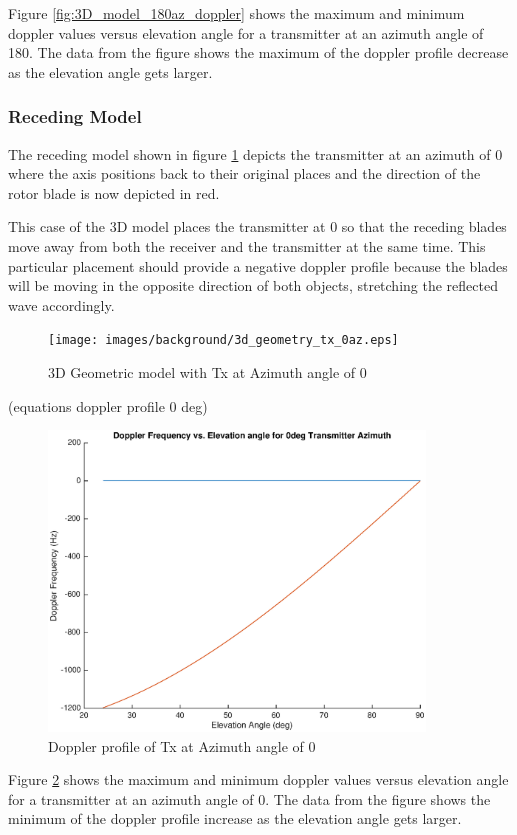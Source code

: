 Figure \ref{fig:3D_model_180az_doppler} shows the maximum and minimum doppler values versus elevation angle for a transmitter at an azimuth angle of 180\textdegree. The data from the figure shows the maximum of the doppler profile decrease as the elevation angle gets larger.

\subsubsection{Receding Model}
The receding model shown in figure \ref{fig:3D_model_0az} depicts the transmitter at an azimuth of 0 \textdegree \space where the axis positions back to their original places and the direction of the rotor blade is now depicted in red.

This case of the 3D model places the transmitter at 0 \textdegree \space so that the receding blades move away from both the receiver and the transmitter at the same time. This particular placement should provide a negative doppler profile because the blades will be moving in the opposite direction of both objects, stretching the reflected wave accordingly.

\begin{figure}
	\begin{center}
		\texttt{[image: images/background/3d\_geometry\_tx\_0az.eps]}
		\caption{3D Geometric model with Tx at Azimuth angle of 0\textdegree}
		\label{fig:3D_model_0az}
	\end{center}
\end{figure}

(equations doppler profile 0 deg)

\begin{figure}
	\begin{center}
		\includegraphics[width=10cm]{images/background/3d_geometry_tx_0az_doppler_profile.eps}
		\caption{Doppler profile of Tx at Azimuth angle of 0\textdegree}
		\label{fig:3D_model_0az_doppler}
	\end{center}
\end{figure}

Figure \ref{fig:3D_model_0az_doppler} shows the maximum and minimum doppler values versus elevation angle for a transmitter at an azimuth angle of 0\textdegree. The data from the figure shows the minimum of the doppler profile increase as the elevation angle gets larger.

